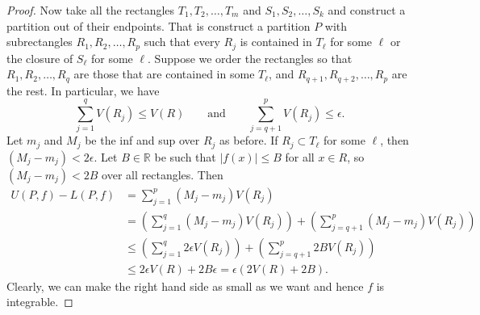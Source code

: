 \documentclass[12pt]{book}
\newcommand{\abs}[1]{\left\lvert {#1} \right\rvert}
\newcommand{\R}{{\mathbb{R}}}
\theoremstyle{plain}
\theoremstyle{remark}
\theoremstyle{definition}
\theoremstyle{exercise}
\theoremstyle{example}
\begin{document}
\begin{proof}
Now take all the rectangles $T_1,T_2,\ldots,T_m$ and $S_1,S_2,\ldots,S_k$
and construct a partition out of their endpoints.  That is construct
a partition $P$ with subrectangles $R_1,R_2,\ldots,R_p$
such that every $R_j$ is contained in $T_\ell$ for some $\ell$
or the closure of $S_\ell$ for some $\ell$.  Suppose we order
the rectangles so that $R_1,R_2,\ldots,R_q$ are those
that are contained in some $T_\ell$, and $R_{q+1},R_{q+2},\ldots,R_{p}$
are the rest.
In particular, we have
\begin{equation*}
\sum_{j=1}^q V(R_j) \leq V(R)
\qquad \text{and} \qquad
\sum_{j=q+1}^p V(R_j) \leq \epsilon .
\end{equation*}
Let $m_j$ and $M_j$ be the inf and sup
over $R_j$ as before.
If $R_j \subset T_\ell$ for some $\ell$, then $(M_j-m_j) < 2 \epsilon$.
Let $B \in \R$ be such that
$\abs{f(x)} \leq B$ for all $x \in R$, so $(M_j-m_j) < 2B$ over all
rectangles. Then
\begin{equation*}
\begin{split}
U(P,f)-L(P,f)
& =
\sum_{j=1}^p (M_j-m_j) V(R_j)
\\
& =
\left(
\sum_{j=1}^q (M_j-m_j) V(R_j)
\right)
+
\left(
\sum_{j=q+1}^p (M_j-m_j) V(R_j)
\right)
\\
& \leq
\left(
\sum_{j=1}^q 2\epsilon V(R_j)
\right)
+
\left(
\sum_{j=q+1}^p 2 B V(R_j)
\right)
\\
& \leq
2 \epsilon V(R)
+
2B \epsilon = \epsilon (2V(R)+2B) .
\end{split}
\end{equation*}
Clearly, we can make the right hand side as small as we want
and hence $f$ is integrable.


\end{proof}
\end{document}
